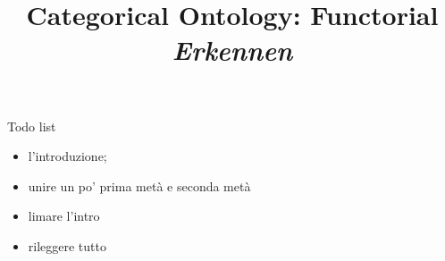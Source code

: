 \documentclass[a4paper]{../birkjour}
\title{Categorical Ontology: Functorial \emph{Erkennen}}
\newcommand{\fo}[1]{{\color{red} #1}}
\begin{document}

\maketitle

{\footnotesize\tableofcontents}
\newpage

\fo{Todo list
  \begin{itemize}
    \item l'introduzione;
    \item unire un po' prima metà e seconda metà
    \item limare l'intro
    \item rileggere tutto
  \end{itemize}
}







{}

\end{document}
